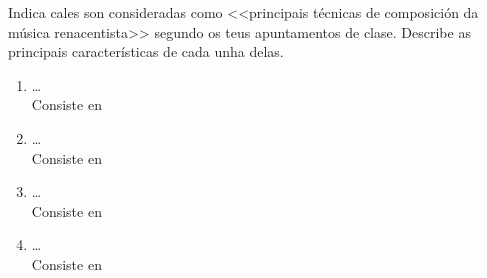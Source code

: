 
    \begin{ejercicio}
Indica cales son consideradas como <<principais técnicas de composición da música renacentista>> segundo os teus apuntamentos de clase. 
Describe as principais características de cada unha delas.
\par
\vspace*{0.25cm}
    \begin{enumerate}[1.]
        \item  \ldots \\ Consiste en
        \par
        \vspace*{3.5cm}
        \item  \ldots \\ Consiste en
        \par
        \vspace*{3.5cm}
        \item  \ldots \\ Consiste en
        \par
        \vspace*{3.5cm}
        \item  \ldots \\ Consiste en
        \par
        \vspace*{3.5cm}
    \end{enumerate}
    \end{ejercicio}
